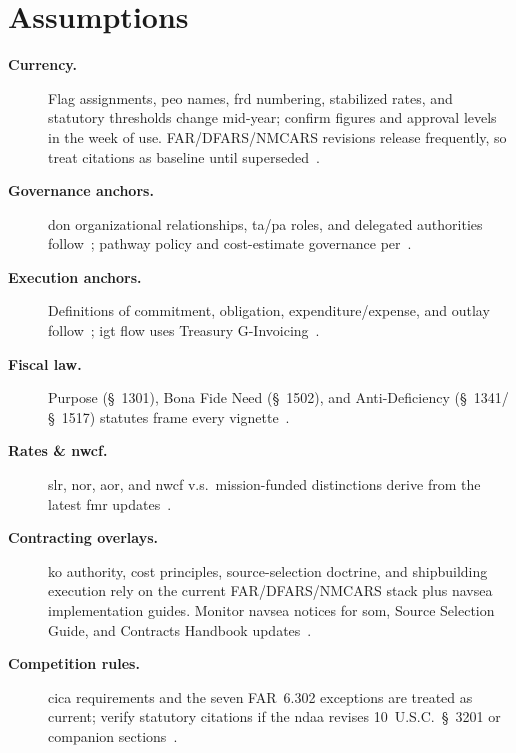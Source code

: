 \documentclass[../main.tex]{subfiles}
\begin{document}

\section{Assumptions}
\begin{description}
	\item[\textbf{Currency.}] Flag assignments, \ac{peo} names, \ac{frd} numbering, stabilized rates, and statutory thresholds change mid-year; confirm figures and approval levels in the week of use. FAR/DFARS/NMCARS revisions release frequently, so treat citations as baseline until superseded~\autocite{FAR,DFARS,NMCARS}.
	\item[\textbf{Governance anchors.}] \ac{don} organizational relationships, \ac{ta}/\ac{pa} roles, and delegated authorities follow~\autocite{SECNAV5400-15D,SECNAV5000-2G}; pathway policy and cost-estimate governance per~\autocite{DoDI5000-85}.
	\item[\textbf{Execution anchors.}] Definitions of commitment, obligation, expenditure/expense, and outlay follow~\autocite{DoDFMR-Vol3}; \ac{igt} flow uses Treasury G-Invoicing~\autocite{Treasury-GInvoicing}.
	\item[\textbf{Fiscal law.}] Purpose (\S~1301), Bona Fide Need (\S~1502), and Anti-Deficiency (\S~1341/\S~1517) statutes frame every vignette~\autocite{USC-1301-Purpose,USC-1502-BFN,USC-1341-ADA}.
	\item[\textbf{Rates \& \ac{nwcf}.}] \ac{slr}, \ac{nor}, \ac{aor}, and \ac{nwcf} v.s.\ mission-funded distinctions derive from the latest \ac{fmr} updates~\autocite{DoDFMR-Vol3,DoDFMR-Vol3-Ch19}.
	\item[\textbf{Contracting overlays.}] \ac{ko} authority, cost principles, source-selection doctrine, and shipbuilding execution rely on the current FAR/DFARS/NMCARS stack plus \ac{navsea} implementation guides. Monitor \ac{navsea} notices for \ac{som}, Source Selection Guide, and Contracts Handbook updates~\autocite{FAR,DFARS,NMCARS,SOM-Ch3-2023,NAVSEA-Source-Selection-Guide-2022,NAVSEA-Contracts-Handbook-2023}.
	\item[\textbf{Competition rules.}] \ac{cica} requirements and the seven FAR~6.302 exceptions are treated as current; verify statutory citations if the \ac{ndaa} revises 10~U.S.C.~\S~3201 or companion sections~\autocite{USC-3201-CICA,FAR}.

\end{description}
\end{document}
